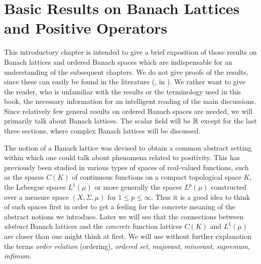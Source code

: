 \setcounter{chapter}{0}
\chapter{Basic Results on Banach Lattices and Positive Operators}\label{chap:c1}

This introductory chapter is intended to give a brief exposition of those results on Banach lattices and ordered Banach spaces which are indispensable for an understanding of the subsequent chapters.
We do not give proofs of the results, since these can easily be found in the literature (\eg, in \citet{schaefer:1974}).
We rather want to give the reader, who is unfamiliar with the results or the terminology used in this book, the necessary information for an intelligent reading of the main discussions.
Since relatively few general results on ordered Banach spaces are needed, we will primarily talk about Banach lattices.
The scalar field will be $\mathbb{R}$ except for the last three sections, where complex Banach lattices will be discussed.

The notion of a Banach lattice was devised to obtain a common abstract setting within which one could talk about phenomena related to positivity.
This has previously been studied in various types of spaces of real-valued functions, such as the spaces $ C(K) $ of continuous functions on a compact topological space $ K $, the Lebesgue spaces $ L^{1}(\mu) $ or more generally the spaces $ L^{p}(\mu) $ constructed over a measure space $ (X,\Sigma,\mu) $ for $ 1 \leq p \leq \infty $.
Thus it is a good idea to think of such spaces first in order to get a feeling for the concrete meaning of the abstract notions we introduce.
Later we will see that the connections between \emph{abstract} Banach lattices and the \emph{concrete} function lattices $ C(K) $ and $ L^{1}(\mu) $ are closer than one might think at first.
We will use without further explanation the terms \emph{order relation} (ordering), \emph{ordered set}, \emph{majorant}, \emph{minorant}, \emph{supremum}, \emph{infimum}.

